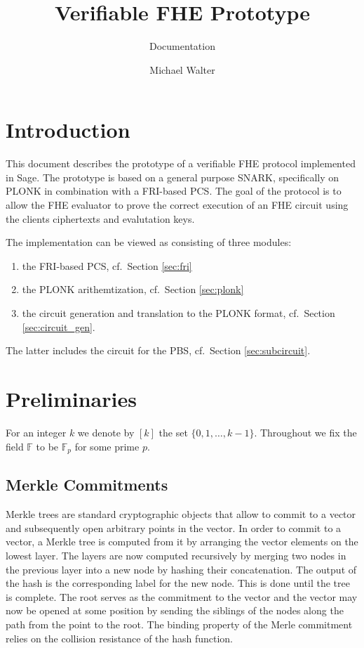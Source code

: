 \documentclass[final]{zamarep}
\title{Verifiable FHE Prototype}
\subtitle{Documentation}
\author[MW]{Michael Walter}
\newcommand{\field}{\mathbb{F}}
\begin{document}
\maketitle

\section{Introduction}\label{sec:introduction}

This document describes the prototype of a verifiable FHE protocol implemented in Sage. The prototype is based on a general purpose SNARK, specifically on PLONK in combination with a FRI-based PCS. The goal of the protocol is to allow the FHE evaluator to prove the correct execution of an FHE circuit using the clients ciphertexts and evalutation keys.

The implementation can be viewed as consisting of three modules:
\begin{enumerate}
\item the FRI-based PCS, cf.\ Section \ref{sec:fri}
\item the PLONK arithemtization, cf.\ Section \ref{sec:plonk}
\item the circuit generation and translation to the PLONK format, cf.\ Section \ref{sec:circuit_gen}.
\end{enumerate}
The latter includes the circuit for the PBS, cf.\ Section \ref{sec:subcircuit}.

\section{Preliminaries}
\label{sec:prelims}
For an integer $k$ we denote by $[k]$ the set $\{0, 1, \dots, k-1\}$. Throughout we fix the field $\field$ to be $\field_p$ for some prime $p$. 

\subsection{Merkle Commitments}
\label{sec:merkle}

Merkle trees are standard cryptographic objects that allow to commit to a vector and subsequently open arbitrary points in the vector. In order to commit to a vector, a Merkle tree is computed from it by arranging the vector elements on the lowest layer. The layers are now computed recursively by merging two nodes in the previous layer into a new node by hashing their concatenation. The output of the hash is the corresponding label for the new node. This is done until the tree is complete. The root serves as the commitment to the vector and the vector may now be opened at some position by sending the siblings of the nodes along the path from the point to the root. The binding property of the Merle commitment relies on the collision resistance of the hash function.
\end{document}
